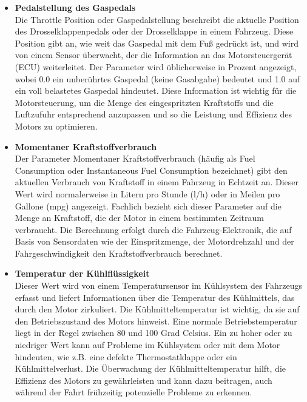 \documentclass[oneside]{ausarbeitung}
\begin{document}
\begin{itemize}
  \item \textbf{Pedalstellung des Gaspedals} \\ Die Throttle Position oder Gaspedalstellung beschreibt die aktuelle Position des Drosselklappenpedals oder der Drosselklappe in einem Fahrzeug. Diese Position gibt an, wie weit das Gaspedal mit dem Fuß gedrückt ist, und wird von einem Sensor überwacht, der die Information an das Motorsteuergerät (ECU) weiterleitet.
  Der Parameter wird üblicherweise in Prozent angezeigt, wobei 0.0 ein unberührtes Gaspedal (keine Gasabgabe) bedeutet und 1.0 auf ein voll belastetes Gaspedal hindeutet. Diese Information ist wichtig für die Motorsteuerung, um die Menge des eingespritzten Kraftstoffs und die Luftzufuhr entsprechend anzupassen und so die Leistung und Effizienz des Motors zu optimieren.
  \item \textbf{Momentaner Kraftstoffverbrauch} \\ Der Parameter Momentaner Kraftstoffverbrauch (häufig als Fuel Consumption oder Instantaneous Fuel Consumption bezeichnet) gibt den aktuellen Verbrauch von Kraftstoff in einem Fahrzeug in Echtzeit an. Dieser Wert wird normalerweise in Litern pro Stunde (l/h) oder in Meilen pro Gallone (mpg) angezeigt.
  Fachlich bezieht sich dieser Parameter auf die Menge an Kraftstoff, die der Motor in einem bestimmten Zeitraum verbraucht. Die Berechnung erfolgt durch die Fahrzeug-Elektronik, die auf Basis von Sensordaten wie der Einspritzmenge, der Motordrehzahl und der Fahrgeschwindigkeit den Kraftstoffverbrauch berechnet.
  \item \textbf{Temperatur der Kühlflüssigkeit} \\ Dieser Wert wird von einem Temperatursensor im Kühlsystem des Fahrzeugs erfasst und liefert Informationen über die Temperatur des Kühlmittels, das durch den Motor zirkuliert.
  Die Kühlmitteltemperatur ist wichtig, da sie auf den Betriebszustand des Motors hinweist. Eine normale Betriebstemperatur liegt in der Regel zwischen 80 und 100 Grad Celsius. Ein zu hoher oder zu niedriger Wert kann auf Probleme im Kühlsystem oder mit dem Motor hindeuten, wie z.B. eine defekte Thermostatklappe oder ein Kühlmittelverlust.
  Die Überwachung der Kühlmitteltemperatur hilft, die Effizienz des Motors zu gewährleisten und kann dazu beitragen, auch während der Fahrt frühzeitig potenzielle Probleme zu erkennen.
\end{itemize}
\end{document}
